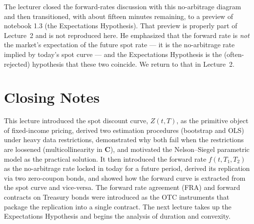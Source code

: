 The lecturer closed the forward-rates discussion with this no-arbitrage
diagram and then transitioned, with about fifteen minutes remaining, to a
preview of notebook 1.3 (the Expectations Hypothesis). That preview is
properly part of Lecture~2 and is not reproduced here. He emphasized that
the forward rate is \emph{not} the market's expectation of the future spot
rate --- it is the no-arbitrage rate implied by today's spot curve --- and
the Expectations Hypothesis is the (often-rejected) hypothesis that these
two coincide. We return to that in Lecture~2.

\section*{Closing Notes}

This lecture introduced the spot discount curve, $Z(t,T)$, as the primitive
object of fixed-income pricing, derived two estimation procedures (bootstrap
and OLS) under heavy data restrictions, demonstrated why both fail when the
restrictions are loosened (multicollinearity in $\mathbf{C}$), and motivated
the Nelson--Siegel parametric model as the practical solution. It then
introduced the forward rate $f(t,T_1,T_2)$ as the no-arbitrage rate locked in
today for a future period, derived its replication via two zero-coupon bonds,
and showed how the forward curve is extracted from the spot curve and
vice-versa. The forward rate agreement (FRA) and forward contracts on
Treasury bonds were introduced as the OTC instruments that package the
replication into a single contract. The next lecture takes up the
Expectations Hypothesis and begins the analysis of duration and convexity.
